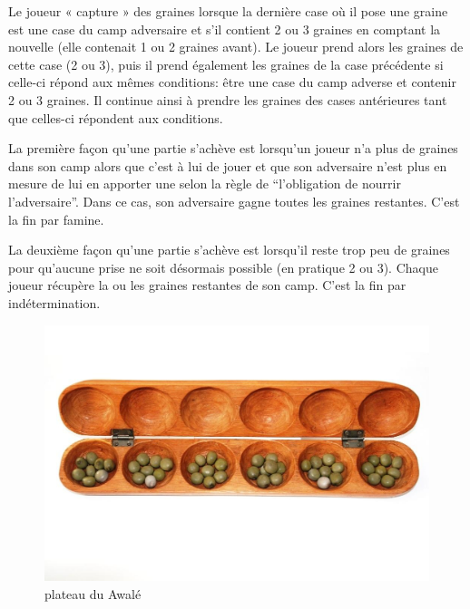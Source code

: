 \begin{itemize}
    Le joueur « capture » des graines lorsque la dernière case où il pose une graine est une case du camp adversaire et s'il contient 2 ou 3 
    graines en comptant la nouvelle (elle contenait 1 ou 2 graines avant). Le joueur prend alors les graines de cette case (2 ou 3), puis il 
    prend également les graines de la case précédente si celle-ci répond aux mêmes conditions: être une case du camp adverse et contenir 2 ou 3 graines. 
    Il continue ainsi à prendre les graines des cases antérieures tant que celles-ci répondent aux conditions.

    La première façon qu'une partie s'achève est lorsqu'un joueur n'a plus de graines dans son camp alors que c'est à lui de jouer et que son adversaire n’est plus en mesure 
    de lui en apporter une selon la règle de ``l'obligation de nourrir l'adversaire''. Dans ce cas, son adversaire gagne toutes les graines restantes. C’est 
    la fin par famine.

    La deuxième façon qu'une partie s'achève est lorsqu'il reste trop peu de graines pour qu'aucune prise ne soit désormais possible (en pratique 2 ou 3). 
    Chaque joueur récupère la ou les graines restantes de son camp. C'est la fin par indétermination.
    
    \begin{figure}[!htb]
        \begin{center}
            \includegraphics[scale=0.5]{root/awale_en_bois}
        \end{center}
        \caption{plateau du Awalé}\label{fig:awale_en_bois}
    \end{figure}

\end{itemize}

